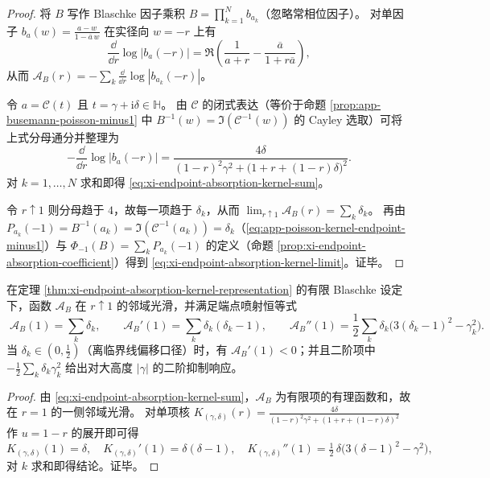 \begin{proof}
将 \(B\) 写作 Blaschke 因子乘积 \(B=\prod_{k=1}^{N}b_{a_k}\)（忽略常相位因子）。
对单因子 \(b_a(w)=\frac{a-w}{1-\overline{a}\,w}\) 在实径向 \(w=-r\) 上有
\[
\frac{\dd}{\dd r}\log|b_a(-r)|
=\Re\!\left(\frac{1}{a+r}-\frac{\overline a}{1+r\overline a}\right),
\]
从而 \(\mathcal{A}_B(r)=-\sum_k \frac{\dd}{\dd r}\log|b_{a_k}(-r)|\)。
\par
令 \(a=\mathcal{C}(t)\) 且 \(t=\gamma+\mathrm{i}\delta\in\mathbb{H}\)。
由 \(\mathcal{C}\) 的闭式表达（等价于命题 \ref{prop:app-busemann-poisson-minus1} 中 \(B^{-1}(w)=\Im(\mathcal{C}^{-1}(w))\) 的 Cayley 选取）可将上式分母通分并整理为
\[
-\frac{\dd}{\dd r}\log|b_a(-r)|
=\frac{4\delta}{(1-r)^2\gamma^2+\bigl(1+r+(1-r)\delta\bigr)^2}.
\]
对 \(k=1,\dots,N\) 求和即得 \eqref{eq:xi-endpoint-absorption-kernel-sum}。
\par
令 \(r\uparrow 1\) 则分母趋于 \(4\)，故每一项趋于 \(\delta_k\)，从而
\(\lim_{r\uparrow 1}\mathcal{A}_B(r)=\sum_k\delta_k\)。
再由 \(P_{a_k}(-1)=B^{-1}(a_k)=\Im(\mathcal{C}^{-1}(a_k))=\delta_k\)（\eqref{eq:app-poisson-kernel-endpoint-minus1}）与 \(\Phi_{-1}(B)=\sum_k P_{a_k}(-1)\) 的定义（命题 \ref{prop:xi-endpoint-absorption-coefficient}）得到 \eqref{eq:xi-endpoint-absorption-kernel-limit}。证毕。
\end{proof}

\begin{theorem}[端点喷射不变量：\texorpdfstring{$\mathcal{A}_B$}{A\_B} 在 \texorpdfstring{$r=1$}{r=1} 的低阶导数给出可核验“矩”]\label{thm:xi-endpoint-absorption-jet-moments}
在定理 \ref{thm:xi-endpoint-absorption-kernel-representation} 的有限 Blaschke 设定下，函数 \(\mathcal{A}_B\) 在 \(r\uparrow 1\) 的邻域光滑，并满足端点喷射恒等式
\[
\boxed{\;
\mathcal{A}_B(1)=\sum_{k}\delta_k,\qquad
\mathcal{A}_B'(1)=\sum_{k}\delta_k(\delta_k-1),\qquad
\mathcal{A}_B''(1)=\frac12\sum_{k}\delta_k\bigl(3(\delta_k-1)^2-\gamma_k^2\bigr).\;}
\]
当 \(\delta_k\in(0,\tfrac12)\)（离临界线偏移口径）时，有 \(\mathcal{A}_B'(1)<0\)；并且二阶项中
\(-\tfrac12\sum_k\delta_k\gamma_k^2\)
给出对大高度 \(|\gamma|\) 的二阶抑制响应。
\end{theorem}

\begin{proof}
由 \eqref{eq:xi-endpoint-absorption-kernel-sum}，\(\mathcal{A}_B\) 为有限项的有理函数和，故在 \(r=1\) 的一侧邻域光滑。
对单项核
\(
K_{(\gamma,\delta)}(r)=\frac{4\delta}{(1-r)^2\gamma^2+(1+r+(1-r)\delta)^2}
\)
作 \(u=1-r\) 的展开即可得
\[
K_{(\gamma,\delta)}(1)=\delta,\quad
K_{(\gamma,\delta)}'(1)=\delta(\delta-1),\quad
K_{(\gamma,\delta)}''(1)=\tfrac12\,\delta\bigl(3(\delta-1)^2-\gamma^2\bigr),
\]
对 \(k\) 求和即得结论。证毕。
\end{proof}

